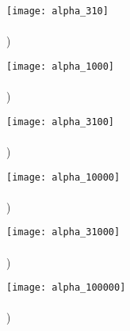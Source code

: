 \documentclass[12pt, letterpaper]{article}
\begin{document}
\begin{figure}[h!]
	\begin{minipage}{0.48\textwidth}
		\texttt{[image: alpha\_310]} \\
		\vspace{-13em} \\ ) \\ \vspace{13em}
	\end{minipage}
	\begin{minipage}{0.48\textwidth}
		\texttt{[image: alpha\_1000]} \\
		\vspace{-13em} \\ ) \\ \vspace{13em}
	\end{minipage}
	
	\vspace{-3em}
	
	\begin{minipage}{0.48\textwidth}
		\texttt{[image: alpha\_3100]} \\
		\vspace{-13em} \\ ) \\ \vspace{13em}
	\end{minipage}
	\begin{minipage}{0.48\textwidth}
		\texttt{[image: alpha\_10000]} \\
		\vspace{-13em} \\ ) \\ \vspace{13em}
	\end{minipage}
	
	\vspace{-3em}
	
	\begin{minipage}{0.48\textwidth}
		\texttt{[image: alpha\_31000]} \\
		\vspace{-13em} \\ ) \\ \vspace{13em}
	\end{minipage}
	\begin{minipage}{0.48\textwidth}
		\texttt{[image: alpha\_100000]} \\
		\vspace{-13em} \\ ) \\ \vspace{13em}
	\end{minipage}
	

\end{figure}
\end{document}
